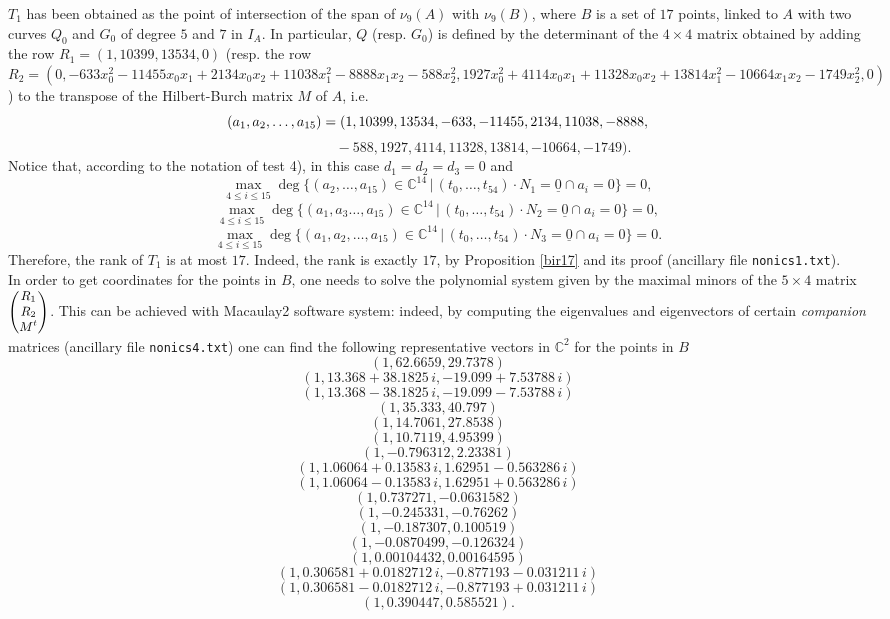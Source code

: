 \documentclass{amsart}
\newcommand{\C}{\mathbb{C}}
\theoremstyle{definition}
\begin{document}
\noindent $T_1$ has been obtained as the point of intersection of the span of $\nu_9(A)$ with $\nu_9(B)$, where $B$ is a set of $17$ points, linked to $A$ with two curves $ Q_{0} $ and $ G_{0} $ of degree $ 5 $ and $ 7 $ in $ I_{A} $. In particular, $ Q $ (resp. $ G_{0} $) is defined by the determinant of the $4 \times 4$ matrix obtained by adding the row $ R_{1} = (1,10399,13534,0) $ (resp. the row $ R_{2} = (0,-633x_0^2-11455x_0x_1+2134x_0x_2+11038x_1^2-8888x_1x_2-588x_2^2, 1927x_0^2+4114x_0x_1+11328x_0x_2+13814x_1^2-10664x_1x_2-1749x_2^2,0) $) to the transpose of the Hilbert-Burch matrix $ M $ of $ A $, i.e.
$$ (a_{1},a_{2}, \ldots, a_{15}) = \\
(1,10399,13534,-633,-11455,2134,11038,-8888,$$
$$ \quad\quad\quad\quad\quad\quad\,\,\,-588,1927,4114,11328,13814,-10664,-1749).$$
 Notice that, according to the notation of test 4), in this case $ d_{1} = d_{2} = d_{3} = 0 $ and 
$$ \max_{4 \leq i \leq 15} \deg \{(a_{2}, \ldots, a_{15}) \in \C^{14} \, | \, (t_{0}, \ldots, t_{54}) \cdot N_{1} = \underline{0} \cap a_{i} = 0 \} = 0, $$
$$ \max_{4 \leq i \leq 15} \deg \{(a_{1},a_{3} \ldots, a_{15}) \in \C^{14} \, | \, (t_{0}, \ldots, t_{54}) \cdot N_{2} = \underline{0} \cap a_{i} = 0 \} = 0, $$
$$ \max_{4 \leq i \leq 15} \deg \{(a_{1},a_{2}, \ldots, a_{15}) \in \C^{14} \, | \, (t_{0}, \ldots, t_{54}) \cdot N_{3} = \underline{0} \cap a_{i} = 0 \} = 0. $$
Therefore, the rank of $ T_1 $ is at most $ 17 $. Indeed, the rank is exactly $17$, by Proposition \ref{bir17} and its proof (ancillary file \texttt{nonics1.txt}).\\
In order to get coordinates for the points in $ B $, one needs to solve the polynomial system given by the maximal minors of the $ 5 \times 4 $ matrix $ {\small{\begin{pmatrix} R_{1} \cr R_{2} \cr M^{t} \\ \end{pmatrix}}} $. This can be achieved with Macaulay2 software system: indeed, by computing the eigenvalues and eigenvectors of certain \emph{companion} matrices (ancillary file \texttt{nonics4.txt}) one can find the following representative vectors in $ \C^2 $ for the points in $ B $
{\small{$$ (1,62.6659,29.7378) $$
$$ (1,13.368+38.1825 \, i,-19.099+7.53788 \, i) $$
$$ (1,13.368-38.1825 \, i,-19.099-7.53788 \, i) $$
$$ (1,35.333,40.797) $$
$$ (1,14.7061,27.8538) $$
$$ (1,10.7119,4.95399) $$
$$ (1,-0.796312,2.23381) $$
$$ (1,1.06064+0.13583 \, i,1.62951-0.563286 \, i) $$
$$ (1,1.06064 -0.13583 \,i,1.62951+0.563286 \, i) $$
$$ (1,0.737271,-0.0631582) $$  
$$ (1,-0.245331,-0.76262) $$
$$ (1,-0.187307,0.100519) $$
$$ (1,-0.0870499,-0.126324) $$
$$ (1,0.00104432,0.00164595) $$
$$ (1,0.306581+0.0182712 \, i,-0.877193-0.031211\, i) $$
$$ (1,0.306581-0.0182712 \, i,-0.877193+0.031211 \, i) $$
$$ (1,0.390447,0.585521). $$}}
\end{document}
